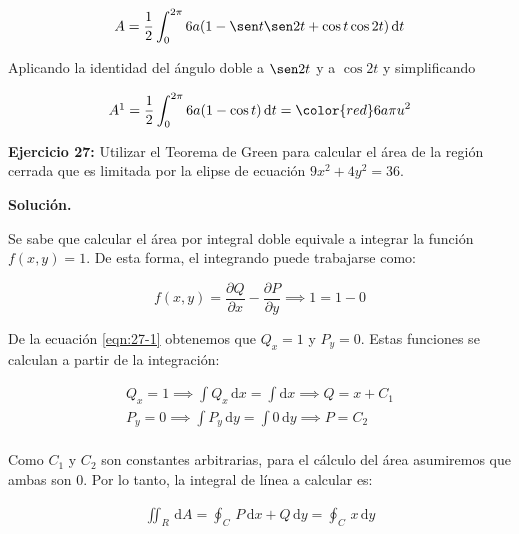 \documentclass[12pt]{article}
\DeclareMathOperator{\di}{d\!}
\begin{document}
\begin{align*}
	A = \frac{1}{2} \int_0^{2\pi} 6a (1-  \sen t\sen 2t + \cos t \cos 2t) \di t
\end{align*}

Aplicando la identidad del ángulo doble a $\sen 2t$ y a $\cos 2t$ y simplificando

\begin{align*}
	 A \footnotemark = \frac{1}{2} \int_0^{2\pi} 6a(1-\cos t) \di t = \color{red} 6a\pi u^2 
\end{align*} 



\noindent \textbf{Ejercicio 27:} Utilizar el Teorema de Green para calcular el área de la región cerrada que es limitada por la elipse de ecuación $9x^2 + 4y^2 = 36$.

\vspace{5mm}

\noindent \textbf{Solución.}

\vspace{3mm}

\noindent Se sabe que calcular el área por integral doble equivale a integrar la función $f(x, y) = 1$. De esta forma, el integrando puede trabajarse como:

\begin{equation}\label{eqn:27-1}\tag{1}
	f(x, y) = \frac{\partial Q}{\partial x} - \frac{\partial P}{\partial y} \implies 1 = 1 - 0
\end{equation}

\noindent De la ecuación \eqref{eqn:27-1} obtenemos que $Q_x = 1$ y $P_y = 0$. Estas funciones se calculan a partir de la integración:

\begin{align*}
	Q_x = 1 \implies \int Q_x\, \mathrm{d}x = \int \mathrm{d}x \implies Q = x + C_1 \\
	P_y = 0 \implies \int P_y\, \mathrm{d}y = \int 0\, \mathrm{d}y \implies P = C_2 \\
\end{align*}

\noindent Como $C_1$ y $C_2$ son constantes arbitrarias, para el cálculo del área asumiremos que ambas son 0. Por lo tanto, la integral de línea a calcular es:

\begin{align*}
	\iint_R\,\mathrm{d}A = \oint_C\, P\,\mathrm{d}x + Q\,\mathrm{d}y = \oint_C\, x\, \mathrm{d}y
\end{align*}
\end{document}
